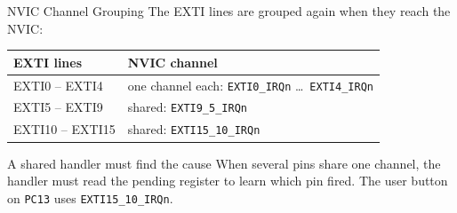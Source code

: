 \documentclass[9pt,aspectratio=169,xcolor=table]{beamer}
\begin{document}
\begin{frame}{NVIC Channel Grouping}
    \leavevmode
    {\small The EXTI lines are grouped again when they reach the NVIC:}

    \vspace{2mm}
    \begin{center}
    {\small
    \striped
    \begin{tabular}{@{}l l@{}}
        \toprule
        \textbf{EXTI lines} & \textbf{NVIC channel} \\
        \midrule
        EXTI0 -- EXTI4   & one channel each: \texttt{EXTI0\_IRQn} \ldots\ \texttt{EXTI4\_IRQn} \\
        EXTI5 -- EXTI9   & shared: \texttt{EXTI9\_5\_IRQn} \\
        EXTI10 -- EXTI15 & shared: \texttt{EXTI15\_10\_IRQn} \\
        \bottomrule
    \end{tabular}}
    \end{center}

    \vspace{3mm}
    \begin{block}{A shared handler must find the cause}
        When several pins share one channel, the handler must read the \alert{pending register} to learn which pin fired. The user button on \texttt{PC13} uses \texttt{EXTI15\_10\_IRQn}.
    \end{block}
\end{frame}
\end{document}
